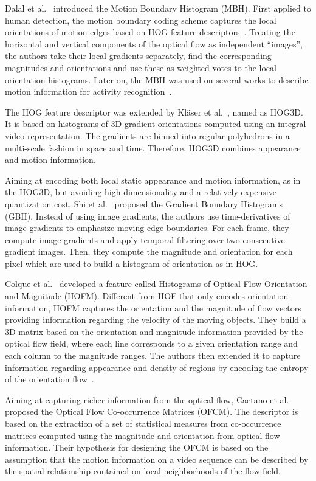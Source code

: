 \documentclass[10pt,conference]{IEEEtran}
\begin{document}
Dalal et al.~\cite{Dalal:2006} introduced the Motion Boundary Histogram (MBH). First applied to human detection, the motion boundary coding scheme captures the local orientations of motion edges based on HOG feature descriptors~\cite{Dalal:2005}. Treating the horizontal and vertical components of the optical flow as independent ``images'', the authors take their local gradients separately, find the corresponding magnitudes and orientations and use these as weighted votes to the local orientation histograms. Later on, the MBH was used on several works to describe motion information for activity recognition~\cite{Laptev:2008, Wang:2011, Wang:2013}.

The HOG feature descriptor was extended by Kl\"{a}ser et al.~\cite{Klaser:2008}, named as HOG3D. It is based on histograms of 3D gradient orientations computed using an integral video representation. The gradients are binned into regular polyhedrons in a multi-scale fashion in space and time. Therefore, HOG3D combines appearance and motion information.

Aiming at encoding both local static appearance and motion information, as in the HOG3D, but avoiding high dimensionality and a relatively expensive quantization cost, Shi et al.~\cite{Shi:2015} proposed the Gradient Boundary Histograms (GBH). Instead of using image gradients, the authors use time-derivatives of image gradients to emphasize moving edge boundaries. For each frame, they compute image gradients and apply temporal filtering over two consecutive gradient images. Then, they compute the magnitude and orientation for each pixel which are used to build a histogram of orientation as in HOG.

Colque et al.~\cite{Colque:2015} developed a feature called Histograms of Optical Flow Orientation and Magnitude (HOFM). Different from HOF that only encodes orientation information, HOFM captures the orientation and the magnitude of flow vectors providing information regarding the velocity of the moving objects. They build a 3D matrix based on the orientation and magnitude information provided by the optical flow field, where each line corresponds to a given orientation range and each column to the magnitude ranges. The authors then extended it to capture information regarding  appearance and density of regions by encoding the entropy of the orientation flow~\cite{Colque:2017}.

Aiming at capturing richer information from the optical flow, Caetano et al.~\cite{Caetano:2016} proposed the Optical Flow Co-occurrence Matrices (OFCM). The descriptor is based on the extraction of a set of statistical measures from co-occurrence matrices computed using the magnitude and orientation from optical flow information. Their hypothesis for designing the OFCM is based on the assumption that the motion information on a video sequence can be described by the spatial relationship contained on local neighborhoods of the flow field.
\end{document}
